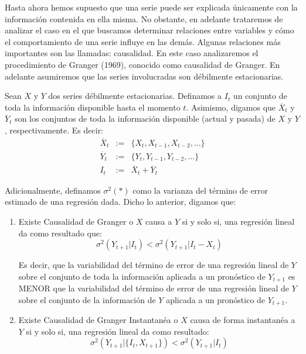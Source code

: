 \documentclass[
]{book}
\begin{document}
Hasta ahora hemos supuesto que una serie puede ser explicada únicamente con la información contenida en ella misma. No obstante, en adelante trataremos de analizar el caso en el que buscamos determinar relaciones entre variables y cómo el comportamiento de una serie influye en las demás. Algunas relaciones más importantes son las llamadas: causalidad. En este caso analizaremos el procedimiento de Granger (1969), conocido como causalidad de Granger. En adelante asumiremos que las series involucradas son débilmente estacionarias.

Sean \(X\) y \(Y\) dos series débilmente estacionarias. Definamos a \(I_t\) un conjunto de toda la información disponible hasta el momento \(t\). Asimismo, digamos que \(\overline{X}_t\) y \(\overline{Y}_t\) son los conjuntos de toda la información disponible (actual y pasada) de \(X\) y \(Y\), respectivamente. Es decir:
\begin{eqnarray*}
    \overline{X}_t & := & \{ X_t, X_{t-1}, X_{t-2}, \ldots \} \\
    \overline{Y}_t & := & \{ Y_t, Y_{t-1}, Y_{t-2}, \ldots \} \\
    I_t & := & \overline{X}_t + \overline{Y}_t
\end{eqnarray*}

Adicionalmente, definamos \(\sigma^2(*)\) como la varianza del término de error estimado de una regresión dada. Dicho lo anterior, digamos que:

\begin{enumerate}
  \item Existe Causalidad de Granger o $X$ causa a $Y$ si y solo si, una regresión lineal da como resultado que: 
    \begin{equation}
        \sigma^2 (Y_{t+1} | I_t) < \sigma^2 (Y_{t+1} | I_t - X_t)    
    \end{equation}

Es decir, que la variabilidad del término de error de una regresión lineal de $Y$ sobre el conjunto de toda la información aplicada a un pronóstico de $Y_{t+1}$ es MENOR que la variabilidad del término de error de una regresión lineal de $Y$ sobre el conjunto de la información de $Y$ aplicada a un pronóstico de $Y_{t+1}$.

  \item Existe Causalidad de Granger Instantanéa o $X$ causa de forma instantanéa a $Y$ si y solo si, una regresión lineal da como resultado:
    \begin{equation}
        \sigma^2 (Y_{t+1} | \{ I_t, X_{t+1} \}) < \sigma^2 (Y_{t+1} | I_t)
    \end{equation}
\end{enumerate}
\end{document}
